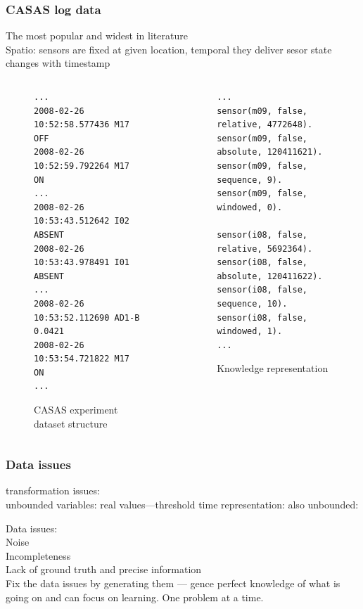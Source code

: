\documentclass[10pt]{beamer}
\begin{document}
\begin{frame}[fragile]
\frametitle{CASAS log data}
The most popular and widest in literature\\
Spatio: sensors are fixed at given location, temporal they deliver sesor state changes with timestamp
{\tiny
\begin{columns}
\begin{column}{5.4cm}
\begin{example}
\begin{figure}
\lstset{
captionpos=b,
language=HTML,
breaklines=true,
float=tb,
basicstyle=\tiny
}
\begin{lstlisting}
...
2008-02-26 10:52:58.577436 M17   OFF
2008-02-26 10:52:59.792264 M17   ON
...
2008-02-26 10:53:43.512642 I02   ABSENT
2008-02-26 10:53:43.978491 I01   ABSENT
...
2008-02-26 10:53:52.112690 AD1-B 0.0421
2008-02-26 10:53:54.721822 M17   ON
...
\end{lstlisting}
\caption{\tiny CASAS experiment dataset structure\label{lst:data}}
\end{figure}
\end{example}
\end{column}
\begin{column}{5.4cm}
\begin{example}
\begin{figure}
\lstset{
captionpos=b,
language=HTML,
breaklines=true,
float=tb,
basicstyle=\tiny
}
\begin{lstlisting}
...
sensor(m09, false, relative, 4772648).
sensor(m09, false, absolute, 120411621).
sensor(m09, false, sequence, 9).
sensor(m09, false, windowed, 0).

sensor(i08, false, relative, 5692364).
sensor(i08, false, absolute, 120411622).
sensor(i08, false, sequence, 10).
sensor(i08, false, windowed, 1).
...
\end{lstlisting}
\tiny\caption{\tiny Knowledge representation\label{lst:knowledge}}
\end{figure}
\end{example}
\end{column}
\end{columns}
}
\end{frame}

\begin{frame}[plain]
  \frametitle{Data issues}

transformation issues:\\
unbounded variables: real values---threshold
time representation: also unbounded: 

Data issues:\\
Noise\\
Incompleteness\\
Lack of ground truth and precise information\\

Fix the data issues by generating them --- gence perfect knowledge of what is going on and can focus on learning. One problem at a time.

\end{frame}
\end{document}
